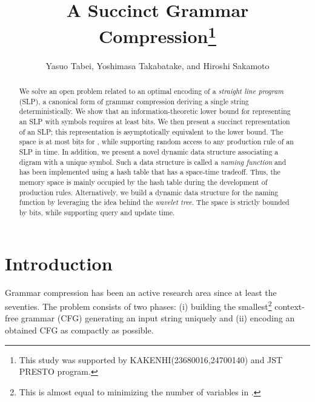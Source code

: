 \documentclass[10pt]{llncs}
\begin{document}
\title{
A Succinct Grammar Compression\thanks{
This study was supported by KAKENHI(23680016,24700140) and JST PRESTO program.
}
}

\author{
Yasuo Tabei, 
Yoshimasa Takabatake, and
Hiroshi Sakamoto
}

\maketitle

\begin{abstract}
We solve an open problem related to an optimal encoding of 
a {\em straight line program} (SLP), a canonical form of grammar compression
deriving a single string deterministically.
We show that an information-theoretic lower bound for representing an SLP with  symbols 
requires at least  bits. 
We then present a succinct representation of an SLP; this representation is asymptotically equivalent to the lower bound.
The space is at most  bits for , while supporting random access to any production rule of 
an SLP in  time.
In addition, we present a novel dynamic data structure associating a digram with a unique symbol.
Such a data structure is called a {\em naming function} and has been implemented using a hash table that has a space-time tradeoff.
Thus, the memory space is mainly occupied by the hash table during the development of production rules.
Alternatively, we build a dynamic data structure for the naming function by leveraging the idea behind the {\em wavelet tree}.
The space is strictly bounded by  bits, while supporting  query and update time.
\end{abstract}

\section{Introduction}
Grammar compression has been an active research area since at least the seventies.
The problem consists of two phases: 
(i) building the smallest\footnote{This is almost equal to minimizing the number of variables in .} 
context-free grammar (CFG) generating an input string uniquely 
and (ii) encoding an obtained CFG as compactly as possible. 
\end{document}
